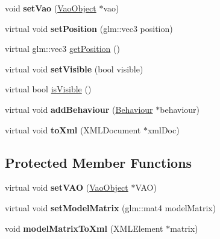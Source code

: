 \begin{DoxyCompactItemize}
void {\bfseries set\+Vao} (\hyperlink{class_vao_object}{Vao\+Object} $\ast$vao)
\item 
\mbox{\label{class_simple_object_af6c38301b53a5dd83f38219a62dd5c61}} 
virtual void {\bfseries set\+Position} (glm\+::vec3 position)
\item 
virtual glm\+::vec3 \hyperlink{class_simple_object_acaf96b4cf35863ca69a123d9404f4e5f}{get\+Position} ()
\item 
\mbox{\label{class_simple_object_a2a4eba5cc71f93824b66d9b1669032e2}} 
virtual void {\bfseries set\+Visible} (bool visible)
\item 
virtual bool \hyperlink{class_simple_object_a2475d0a90f1cb7bc5765a632efe9ddd4}{is\+Visible} ()
\item 
\mbox{\label{class_simple_object_ad4473aa5bb43047e70b3de73db5c0471}} 
virtual void {\bfseries add\+Behaviour} (\hyperlink{class_behaviour}{Behaviour} $\ast$behaviour)
\item 
\mbox{\label{class_simple_object_a89467e4932063b53734ac0e0ff5c05eb}} 
virtual void {\bfseries to\+Xml} (X\+M\+L\+Document $\ast$xml\+Doc)
\end{DoxyCompactItemize}
\subsection*{Protected Member Functions}
\begin{DoxyCompactItemize}
\item 
\mbox{\label{class_simple_object_aa6790553dc4f308a99e35ab1f8ad0a64}} 
virtual void {\bfseries set\+V\+AO} (\hyperlink{class_vao_object}{Vao\+Object} $\ast$V\+AO)
\item 
\mbox{\label{class_simple_object_a906ee1d2032b6f25fdc8eedabf4ac943}} 
virtual void {\bfseries set\+Model\+Matrix} (glm\+::mat4 model\+Matrix)
\item 
\mbox{\label{class_simple_object_af9aca9384bdda21372ab0f28f02af499}} 
void {\bfseries model\+Matrix\+To\+Xml} (X\+M\+L\+Element $\ast$matrix)
\end{DoxyCompactItemize}
